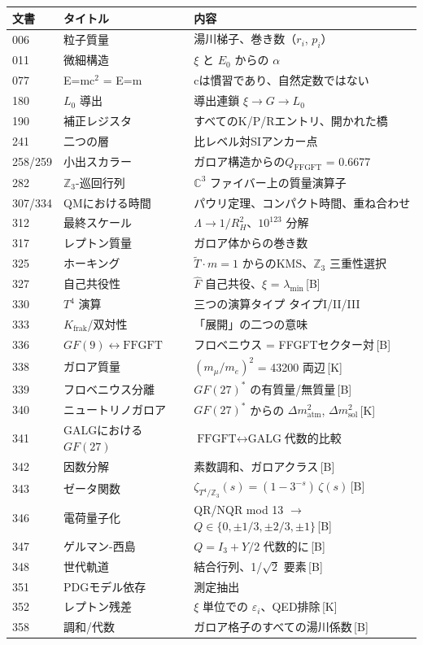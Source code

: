 \documentclass[11pt,openany]{book}
\newcommand{\status}[1]{\penalty10000\,{\tiny\textcolor{gray!70}{[#1]}}}
\begin{document}
\begin{tabular}{lll}
\toprule
文書 & タイトル & 内容 \\
\midrule
006 & 粒子質量 & 湯川梯子、巻き数（$r_i$, $p_i$） \\
011 & 微細構造 & $\xi$ と $E_0$ からの $\alpha$ \\
077 & E=mc$^2$ = E=m & cは慣習であり、自然定数ではない \\
180 & $L_0$ 導出 & 導出連鎖 $\xi \to G \to L_0$ \\
190 & 補正レジスタ & すべてのK/P/Rエントリ、開かれた橋 \\
241 & 二つの層 & 比レベル対SIアンカー点 \\
258/259 & 小出スカラー & ガロア構造からの$Q_\text{FFGFT}$ = 0.6677 \\
282 & $\mathbb{Z}_3$-巡回行列 & $\mathbb{C}^3$ ファイバー上の質量演算子 \\
307/334 & QMにおける時間 & パウリ定理、コンパクト時間、重ね合わせ \\
312 & 最終スケール & $\Lambda \to 1/R_H^2$、$10^{123}$ 分解 \\
317 & レプトン質量 & ガロア体からの巻き数 \\
325 & ホーキング & $\tilde{T}\cdot m=1$ からのKMS、$\mathbb{Z}_3$ 三重性選択 \\
327 & 自己共役性 & $\hat{F}$ 自己共役、$\xi$ = $\lambda_\mathrm{min}$\status{B} \\
330 & $T^4$ 演算 & 三つの演算タイプ タイプI/II/III \\
333 & $K_\text{frak}$/双対性 & 「展開」の二つの意味 \\
336 & $GF(9)\leftrightarrow\text{FFGFT}$ & フロベニウス = FFGFTセクター対\status{B} \\
338 & ガロア質量 & $(m_\mu/m_e)^2$ = 43200 両辺\status{K} \\
339 & フロベニウス分離 & $GF(27)^*$ の有質量/無質量\status{B} \\
340 & ニュートリノガロア & $GF(27)^*$ からの $\Delta m^2_\text{atm}$, $\Delta m^2_\text{sol}$\status{K} \\
341 & GALGにおける $GF(27)$ & $\text{FFGFT}\leftrightarrow\text{GALG}$代数的比較 \\
342 & 因数分解 & 素数調和、ガロアクラス\status{B} \\
343 & ゼータ関数 & $\zeta_{T^4/\mathbb{Z}_3}(s) = (1-3^{-s})\,\zeta(s)$\status{B} \\
346 & 電荷量子化 & QR/NQR mod 13 $\to$ $Q \in \{0,\pm1/3,\pm2/3,\pm1\}$\status{B} \\
347 & ゲルマン-西島 & $Q = I_3 + Y/2$ 代数的に\status{B} \\
348 & 世代軌道 & 結合行列、1/$\sqrt{2}$ 要素\status{B} \\
351 & PDGモデル依存 & 測定抽出 \\
352 & レプトン残差 & $\xi$ 単位での $\varepsilon_i$、QED排除\status{K} \\
358 & 調和/代数 & ガロア格子のすべての湯川係数\status{B} \\
\bottomrule
\end{tabular}
\end{document}

